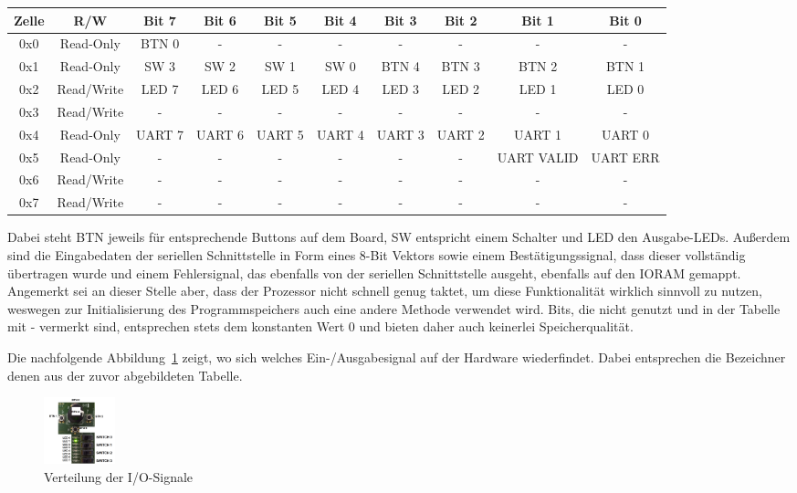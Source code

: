 \begin{center}
	\begin{tabular}{| c | c | c | c | c | c | c | c | c | c |}
	\hline
	Zelle & R/W & Bit 7 & Bit 6 & Bit 5 & Bit 4 & Bit 3 & Bit 2 & Bit 1 & Bit 0 \\ \hline
	0x0 & Read-Only & BTN 0 & - & - & - & - & - & - & - \\ \hline
	0x1 & Read-Only & SW 3 & SW 2 & SW 1 & SW 0 & BTN 4 & BTN 3 & BTN 2 & BTN 1 \\ \hline
	0x2 & Read/Write & LED 7 & LED 6 & LED 5 & LED 4 & LED 3 & LED 2 & LED 1 & LED 0 \\ \hline
	0x3 & Read/Write & - & - & - & - & - & - & - & - \\ \hline
	0x4 & Read-Only & UART 7 & UART 6 & UART 5 & UART 4 & UART 3 & UART 2 & UART 1 & UART 0 \\ \hline
	0x5 & Read-Only & - & - & - & - & - & - & UART VALID & UART ERR \\ \hline
	0x6 & Read/Write & - & - & - & - & - & - & - & - \\ \hline
	0x7 & Read/Write & - & - & - & - & - & - & - & - \\ \hline
	\end{tabular}
\end{center}

Dabei steht BTN jeweils f\"ur entsprechende Buttons auf dem Board, SW entspricht einem Schalter und LED den Ausgabe-LEDs. Au\ss{}erdem sind die Eingabedaten der seriellen Schnittstelle in Form eines 8-Bit Vektors sowie einem Best\"atigungssignal, dass dieser vollst\"andig \"ubertragen wurde und einem Fehlersignal, das ebenfalls von der seriellen Schnittstelle ausgeht, ebenfalls auf den IORAM gemappt. Angemerkt sei an dieser Stelle aber, dass der Prozessor nicht schnell genug taktet, um diese Funktionalit\"at wirklich sinnvoll zu nutzen, weswegen zur Initialisierung des Programmspeichers auch eine andere Methode verwendet wird. Bits, die nicht genutzt und in der Tabelle mit - vermerkt sind, entsprechen stets dem konstanten Wert 0 und bieten daher auch keinerlei Speicherqualit\"at.

Die nachfolgende Abbildung~\ref{fig:pinning} zeigt, wo sich welches Ein-/Ausgabesignal auf der Hardware wiederfindet. Dabei entsprechen die Bezeichner denen aus der zuvor abgebildeten Tabelle.

\begin{figure}[H]
	\centering
		\includegraphics[width=0.1\textwidth]{pinning.png}
	\caption{Verteilung der I/O-Signale}
	\label{fig:pinning}
\end{figure}


